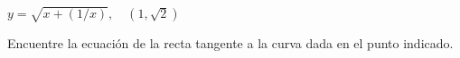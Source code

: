\item $y = \sqrt{x + (1/x)}, \quad (1, \sqrt{2})$
\par
Encuentre la ecuación de la recta tangente a la curva dada en el punto indicado.
